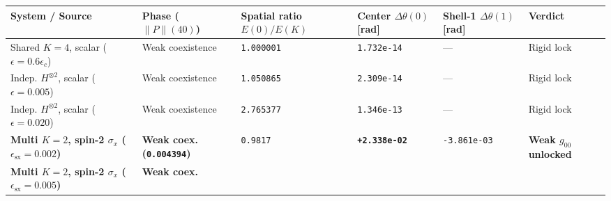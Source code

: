 \documentclass[
  a4paper,
]{article}
\newcounter{none} %
\begin{document}
{\def\LTcaptype{none} %
\begin{longtable}[]{@{}
  >{\raggedright\arraybackslash}p{}
  >{\centering\arraybackslash}p{}
  >{\centering\arraybackslash}p{}
  >{\centering\arraybackslash}p{}
  >{\centering\arraybackslash}p{}
  >{\centering\arraybackslash}p{}@{}}
\toprule\noalign{}
\begin{minipage}[b]{\linewidth}\raggedright
System / Source
\end{minipage} & \begin{minipage}[b]{\linewidth}\centering
Phase (\(\|P\|(40)\))
\end{minipage} & \begin{minipage}[b]{\linewidth}\centering
Spatial ratio \(E(0)/E(K)\)
\end{minipage} & \begin{minipage}[b]{\linewidth}\centering
\textbf{Center \(\Delta\theta(0)\) {[}rad{]}}
\end{minipage} & \begin{minipage}[b]{\linewidth}\centering
\textbf{Shell-1 \(\Delta\theta(1)\) {[}rad{]}}
\end{minipage} & \begin{minipage}[b]{\linewidth}\centering
Verdict
\end{minipage} \\
\midrule\noalign{}
\endhead
\bottomrule\noalign{}
\endlastfoot
Shared \(K=4\), scalar (\(\epsilon=0.6\epsilon_c\)) & Weak coexistence &
\texttt{1.000001} & \texttt{1.732e-14} & --- & Rigid lock \\
Indep. \(H^{\otimes 2}\), scalar (\(\epsilon=0.005\)) & Weak coexistence
& \texttt{1.050865} & \texttt{2.309e-14} & --- & Rigid lock \\
Indep. \(H^{\otimes 2}\), scalar (\(\epsilon=0.020\)) & Weak coexistence
& \texttt{2.765377} & \texttt{1.346e-13} & --- & Rigid lock \\
\textbf{Multi \(K=2\), spin-2 \(\sigma_x\)
(\(\epsilon_{\mathrm{sx}}=0.002\))} & \textbf{Weak coex.
(\texttt{0.004394})} & \texttt{0.9817} & \textbf{\texttt{+2.338e-02}} &
\texttt{-3.861e-03} & \textbf{Weak \(g_{00}\) unlocked} \\
\textbf{Multi \(K=2\), spin-2 \(\sigma_x\)
(\(\epsilon_{\mathrm{sx}}=0.005\))} & \textbf{Weak coex.
}
\end{longtable}}
\end{document}

